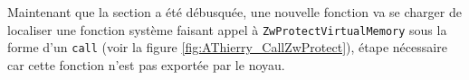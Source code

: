 Maintenant que la section a été débusquée, une nouvelle fonction va se charger de localiser une fonction système faisant appel à \texttt{ZwProtectVirtualMemory} sous la forme d'un \texttt{call} (voir la figure \ref{fig:AThierry_CallZwProtect}), étape nécessaire car cette fonction n'est pas exportée par le noyau.

\begin{figure}
\scriptsize

\end{figure}

